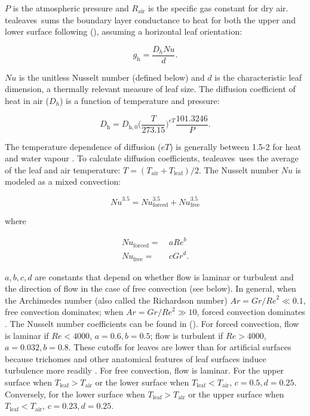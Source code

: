 \documentclass[11pt, oneside]{article}
\newcommand{\pkg}[1]{{\fontseries{b}\selectfont #1}}
\newcommand{\tealeaves}{\pkg{tealeaves}}
\begin{document}
$P$ is the atmospheric pressure and $R_\mathrm{air}$ is the specific gas constant for dry air. \tealeaves~sums the boundary layer conductance to heat for both the upper and lower surface following \citeauthor{Foster_Smith_1986} (\citeyear{Foster_Smith_1986}), assuming a horizontal leaf orientation:

\begin{equation} \label{eq:g_h}
  g_\mathrm{h} = \frac{D_h \mathit{Nu}}{d}.
\end{equation}

$\mathit{Nu}$ is the unitless Nusselt number (defined below) and $d$ is the characteristic leaf dimension, a thermally relevant measure of leaf size. The diffusion coefficient of heat in air ($D_h$) is a function of temperature and pressure:

\begin{equation} \label{eq:D_x}
    D_\mathrm{h} = D_\mathrm{h,0} \Big(\frac{T}{273.15}\Big) ^ {\mathit{eT}} \frac{101.3246}{P}.
\end{equation}

The temperature dependence of diffusion ($\mathit{eT}$) is generally between 1.5-2 for heat and water vapour \citep{Monteith_Unsworth_2013}. To calculate diffusion coefficients, \tealeaves~uses the average of the leaf and air temperature: $T = (T_\mathrm{air} + T_\mathrm{leaf}) / 2$. The Nusselt number $\mathit{Nu}$ is modeled as a mixed convection:

\begin{equation}
  \label{eq:nusselt}
  \mathit{Nu} ^ {3.5} = \mathit{Nu}_\mathrm{forced} ^ {3.5} + \mathit{Nu}_\mathrm{free} ^ {3.5}
\end{equation}

where

\begin{align}
  \mathit{Nu}_\mathrm{forced} =  & ~ a \mathit{Re} ^ b \\
  \mathit{Nu}_\mathrm{free} =    & ~ c \mathit{Gr} ^ d.
\end{align}

$a, b, c, d$ are constants that depend on whether flow is laminar or turbulent and the direction of flow in the case of free convection (see below). In general, when the Archimedes number (also called the Richardson number) $\mathit{Ar} = \mathit{Gr} / \mathit{Re} ^ 2 \ll 0.1$, free convection dominates; when $\mathit{Ar} = \mathit{Gr} / \mathit{Re} ^ 2 \gg 10$, forced convection dominates \citep{Nobel_2009}. The Nusselt number coefficients can be found in \citeauthor{Monteith_Unsworth_2013} (\citeyear{Monteith_Unsworth_2013}). For forced convection, flow is laminar if $\mathit{Re} < 4000$, $a = 0.6, b = 0.5$; flow is turbulent if $\mathit{Re} > 4000$, $a = 0.032, b = 0.8$. These cutoffs for leaves are lower than for artificial surfaces because trichomes and other anatomical features of leaf surfaces induce turbulence more readily \citep{Grace_Wilson_1976}. For free convection, flow is laminar. For the upper surface when $T_\mathrm{leaf} > T_\mathrm{air}$ or the lower surface when $T_\mathrm{leaf} < T_\mathrm{air}$, $c = 0.5, d = 0.25$. Conversely, for the lower surface when $T_\mathrm{leaf} > T_\mathrm{air}$ or the upper surface when $T_\mathrm{leaf} < T_\mathrm{air}$, $c = 0.23, d = 0.25$.
\end{document}
